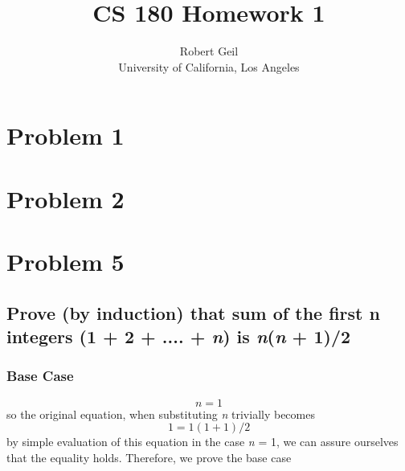 \documentclass[titlepage]{article}
\title{CS 180 Homework 1}
\author{Robert Geil \\
University of California, Los Angeles
}
\numberwithin{equation}{subsection}
\begin{document}
\maketitle

\section{Problem 1}

\section{Problem 2}
\section{}
\section{}
\section{Problem 5}
\subsection{Prove (by induction) that sum of 
the first n integers (1 + 2 + .... + \textit{n}) is \textit{n}(\textit{n} + 1)/2 }
\subsubsection{Base Case}
\begin{equation}
    n = 1
\end{equation}
so the original equation, when substituting \textit{n} trivially becomes
\begin{equation}
    1 = 1(1 + 1) / 2
\end{equation}
by simple evaluation of this equation in the case \textit{n} = 1, we can assure ourselves
that the equality holds. Therefore, we prove the base case
\end{document}
